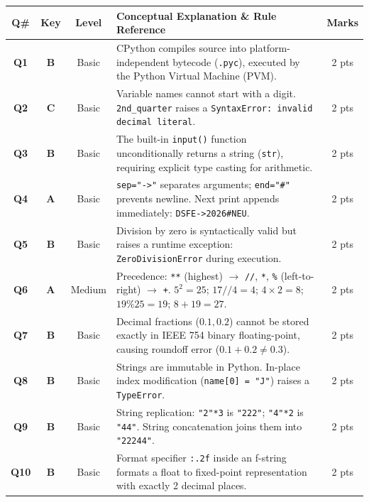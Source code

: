 \documentclass[11pt,a4paper]{article}
\begin{document}
\begin{center}
\renewcommand{\arraystretch}{1.15}
\setlength{\tabcolsep}{3.5pt}
\begin{tabularx}{\textwidth}{|c|c|c|X|c|}
\hline
\textbf{Q\#} & \textbf{Key} & \textbf{Level} & \textbf{Conceptual Explanation \& Rule Reference} & \textbf{Marks} \\
\hline
\textbf{Q1} & \textbf{B} & Basic & CPython compiles source into platform-independent bytecode (\texttt{.pyc}), executed by the Python Virtual Machine (PVM). & 2 pts \\
\hline
\textbf{Q2} & \textbf{C} & Basic & Variable names cannot start with a digit. \texttt{2nd\_quarter} raises a \texttt{SyntaxError: invalid decimal literal}. & 2 pts \\
\hline
\textbf{Q3} & \textbf{B} & Basic & The built-in \texttt{input()} function unconditionally returns a string (\texttt{str}), requiring explicit type casting for arithmetic. & 2 pts \\
\hline
\textbf{Q4} & \textbf{A} & Basic & \texttt{sep="->"} separates arguments; \texttt{end="\#"} prevents newline. Next print appends immediately: \texttt{DSFE->2026\#NEU}. & 2 pts \\
\hline
\textbf{Q5} & \textbf{B} & Basic & Division by zero is syntactically valid but raises a runtime exception: \texttt{ZeroDivisionError} during execution. & 2 pts \\
\hline
\textbf{Q6} & \textbf{A} & Medium & Precedence: \texttt{**} (highest) $\rightarrow$ \texttt{//}, \texttt{*}, \texttt{\%} (left-to-right) $\rightarrow$ \texttt{+}. $5^2=25$; $17//4=4$; $4\times 2=8$; $19\%25=19$; $8+19=27$. & 2 pts \\
\hline
\textbf{Q7} & \textbf{B} & Basic & Decimal fractions ($0.1, 0.2$) cannot be stored exactly in IEEE 754 binary floating-point, causing roundoff error ($0.1+0.2 \ne 0.3$). & 2 pts \\
\hline
\textbf{Q8} & \textbf{B} & Basic & Strings are immutable in Python. In-place index modification (\texttt{name[0] = "J"}) raises a \texttt{TypeError}. & 2 pts \\
\hline
\textbf{Q9} & \textbf{B} & Basic & String replication: \texttt{"2"*3} is \texttt{"222"}; \texttt{"4"*2} is \texttt{"44"}. String concatenation joins them into \texttt{"22244"}. & 2 pts \\
\hline
\textbf{Q10} & \textbf{B} & Basic & Format specifier \texttt{:.2f} inside an f-string formats a float to fixed-point representation with exactly 2 decimal places. & 2 pts \\
\hline
\end{tabularx}
\end{center}
\end{document}
